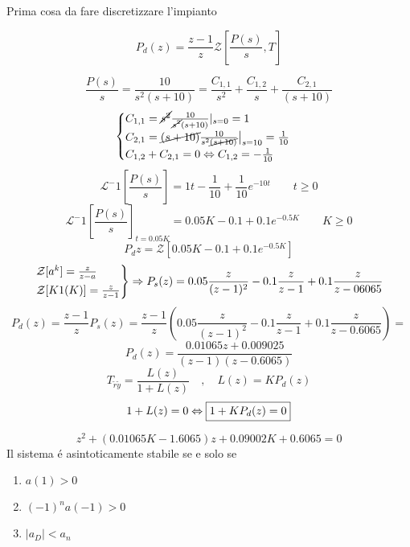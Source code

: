 \documentclass{article}
\begin{document}
Prima cosa da fare discretizzare l'impianto

\[ P_d(z) = \frac{z-1}{z} \mathcal{Z}\left[ \frac{P(s)}{s}, T\right] \]


\[ \frac{P(s)}{s} = \frac{10}{s^2 (s+10)} = \frac{C_{1,1}}{s^2} + \frac{C_{1,2}}{s} + \frac{C_{2,1}}{(s+10)} \]
\[
    \begin{cases}
        C_{1,1} = \cancel{s^2} \frac{10}{\cancel{s^2}(s+10)} |_{s=0} = 1\\
        C_{2,1} = \cancel{(s+10)} \frac{10}{s^2\cancel{(s+10)}} \big|_{s=10} = \frac{1}{10}\\
        C_{1,2} + C_{2,1} = 0 \Leftrightarrow C_{1,2} = -\frac{1}{10}
    \end{cases}
\]
\[\mathcal{L}^-1\left[ \frac{P(s)}{s}\right] = 1t - \frac{1}{10} + \frac{1}{10} e^{-10t} \qquad t\ge 0 \]
\[ \mathcal{L}^-1\left[\frac{P(s)}{s}\right]_{t=0.05K} = 0.05K - 0.1 + 0.1 e^{-0.5K} \qquad K\ge 0\]
\[ P_d{z} = \mathcal{Z}\left[ 0.05K - 0.1 + 0.1 e^{-0.5K} \right]\]
\[
    \begin{rcases}
        \mathcal{Z}[a^k] = \frac{z}{z-a}\\
        \mathcal{Z}[K1(K)] = \frac{z}{z-1}
    \end{rcases} \Rightarrow P_s(z) = 0.05\frac{z}{(z-1)^2} -0.1 \frac{z}{z-1} + 0.1\frac{z}{z-06065}
\]
\[ P_d(z) = \frac{z-1}{z}P_s(z) = \frac{z-1}{z} \left( 0.05 \frac{z}{(z-1)^2} - 0.1\frac{z}{z-1} + 0.1 \frac{z}{z-0.6065}\right) = \]
\[P_d(z) = \frac{0.01065 z + 0.009025}{(z-1)(z-0.6065)}\]
\[ T_{\tilde{r}\tilde{y}} = \frac{L(z)}{1 + L(z)} \quad, \quad L(z) = KP_d(z) \]
\[ 1 + L(z) = 0 \Leftrightarrow \framebox{$1 + KP_d(z) = 0$}\]

\[ z^2 + (0.01065K - 1.6065)z + 0.09002K + 0.6065 = 0 \]
Il sistema \'e asintoticamente stabile se e solo se
\begin{enumerate}
    \item $a(1) > 0$
    \item $(-1)^n a(-1) > 0$
    \item $|a_D| < a_n$
\end{enumerate}
\end{document}

